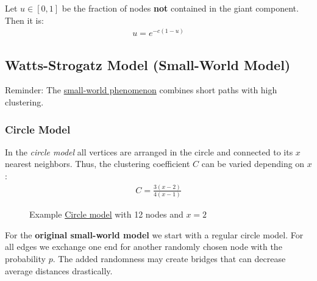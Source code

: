 \documentclass[english]{panikzettel}
\begin{document}
Let $ u \in [0,1] $ be the fraction of nodes \textbf{not} contained in the giant component. Then it is:
\begin{align*}
	u = e^{-c (1-u)}
\end{align*}



\subsection{Watts-Strogatz Model (Small-World Model)}
Reminder: The \hyperref[sec:small_world_problem]{small-world phenomenon} combines short paths with high clustering.

\subsubsection{Circle Model}\label{sec:circle_model}
In the \emph{circle model} all vertices are arranged in the circle and connected to its $ x $ nearest neighbors.
Thus, the clustering coefficient $ C $ can be varied depending on $ x $:
\begin{align*}
	C = \frac{3(x-2)}{4(x-1)}
\end{align*}

\begin{figure}[ht!]
	\centering
	\caption{Example \hyperref[sec:circle_model]{Circle model} with 12 nodes and $ x = 2 $}
\end{figure}

For the \textbf{original small-world model} we start with a regular circle model.
For all edges we exchange one end for another randomly chosen node with the probability $ p $.
The added randomness may create bridges that can decrease average distances drastically.
\end{document}
